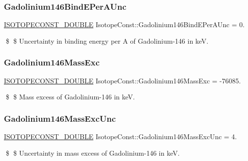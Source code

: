 \subsubsection{\texorpdfstring{Gadolinium146\+Bind\+E\+Per\+A\+Unc}{Gadolinium146BindEPerAUnc}}
{\footnotesize\ttfamily \mbox{\hyperlink{group___isotope_const-_macros_ga8f45a7272ce02c0b4c65c44636ed719a}{I\+S\+O\+T\+O\+P\+E\+C\+O\+N\+S\+T\+\_\+\+D\+O\+U\+B\+LE}} Isotope\+Const\+::\+Gadolinium146\+Bind\+E\+Per\+A\+Unc = 0.}

\$ \$ Uncertainty in binding energy per A of Gadolinium-\/146 in keV. \mbox{\label{group___isotope_const-_gadolinium-_gd146_ga0191dc8597152a16aa24037af367c88f}} 
\subsubsection{\texorpdfstring{Gadolinium146\+Mass\+Exc}{Gadolinium146MassExc}}
{\footnotesize\ttfamily \mbox{\hyperlink{group___isotope_const-_macros_ga8f45a7272ce02c0b4c65c44636ed719a}{I\+S\+O\+T\+O\+P\+E\+C\+O\+N\+S\+T\+\_\+\+D\+O\+U\+B\+LE}} Isotope\+Const\+::\+Gadolinium146\+Mass\+Exc = -\/76085.}

\$ \$ Mass excess of Gadolinium-\/146 in keV. \mbox{\label{group___isotope_const-_gadolinium-_gd146_gade7dc7439112485a23ca6e4b5bf3401b}} 
\subsubsection{\texorpdfstring{Gadolinium146\+Mass\+Exc\+Unc}{Gadolinium146MassExcUnc}}
{\footnotesize\ttfamily \mbox{\hyperlink{group___isotope_const-_macros_ga8f45a7272ce02c0b4c65c44636ed719a}{I\+S\+O\+T\+O\+P\+E\+C\+O\+N\+S\+T\+\_\+\+D\+O\+U\+B\+LE}} Isotope\+Const\+::\+Gadolinium146\+Mass\+Exc\+Unc = 4.}

\$ \$ Uncertainty in mass excess of Gadolinium-\/146 in keV. \mbox{\label{group___isotope_const-_gadolinium-_gd146_gae3d5287b835ff43161491ddb3512ad45}} 
